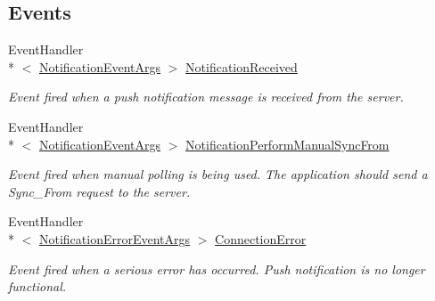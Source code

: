 \subsection*{Events}
\begin{DoxyCompactItemize}
\item 
Event\-Handler\\*
$<$ \hyperlink{class_cloud_api_public_1_1_push_notification_1_1_notification_event_args}{Notification\-Event\-Args} $>$ \hyperlink{class_cloud_api_public_1_1_push_notification_1_1_c_l_notification_a5bafbe473f43db150e6280ca3f2b9f12}{Notification\-Received}
\begin{DoxyCompactList}\small\item\em Event fired when a push notification message is received from the server. \end{DoxyCompactList}\item 
Event\-Handler\\*
$<$ \hyperlink{class_cloud_api_public_1_1_push_notification_1_1_notification_event_args}{Notification\-Event\-Args} $>$ \hyperlink{class_cloud_api_public_1_1_push_notification_1_1_c_l_notification_ac2922d1d48868bd4b3562f3e92d450f7}{Notification\-Perform\-Manual\-Sync\-From}
\begin{DoxyCompactList}\small\item\em Event fired when manual polling is being used. The application should send a Sync\-\_\-\-From request to the server. \end{DoxyCompactList}\item 
Event\-Handler\\*
$<$ \hyperlink{class_cloud_api_public_1_1_push_notification_1_1_notification_error_event_args}{Notification\-Error\-Event\-Args} $>$ \hyperlink{class_cloud_api_public_1_1_push_notification_1_1_c_l_notification_a1fe49d2b1a5f1256ccbf730ceaedf57a}{Connection\-Error}
\begin{DoxyCompactList}\small\item\em Event fired when a serious error has occurred. Push notification is no longer functional. \end{DoxyCompactList}\end{DoxyCompactItemize}


